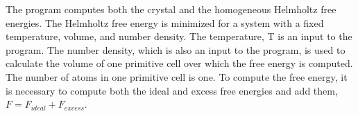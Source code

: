 \documentclass[12pt]{article}
\begin{document}
The program computes both the crystal and the homogeneous Helmholtz free energies. The Helmholtz free energy is minimized for a system with a fixed temperature, volume, and number density. The temperature, T is an input to the program. The number density, which is also an input to the program, is used to calculate the volume of one primitive cell over which the free energy is computed. The number of atoms in one primitive cell is one. To compute the free energy, it is necessary to compute both the ideal and excess free energies and add them, $F = F_{ideal} + F_{excess}$.
\end{document}
